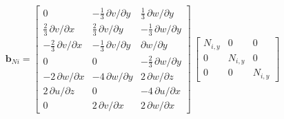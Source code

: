 \begin{equation}
\mathbf{b}_{Ni} = \begin{bmatrix}
0 &  - \tfrac{1}{3} \, \partial v / \partial y & \tfrac{1}{3} \, \partial w / \partial y  \\
\tfrac{2}{3} \, \partial v / \partial x &  \tfrac{2}{3} \, \partial v / \partial y & - \tfrac{1}{3} \, \partial w / \partial y  \\
-\tfrac{2}{3} \, \partial v / \partial x  & -\tfrac{1}{3} \, \partial v / \partial y & \partial w / \partial y \\
0 & 0 & - \tfrac{2}{3} \, \partial w / \partial y   \\
- 2 \, \partial w / \partial x &  - 4 \, \partial w / \partial y & 2 \,  \partial w / \partial z  \\
2 \, \partial u / \partial z &  0 & - 4 \, \partial u / \partial x  \\
0 &  2 \, \partial v / \partial x &  2 \, \partial w / \partial x  \end{bmatrix} \, \begin{bmatrix}
N_{i,y} &  0 & 0  \\
0 & N_{i,y} & 0  \\
0 & 0 & N_{i,y}  \end{bmatrix} 
\end{equation}

